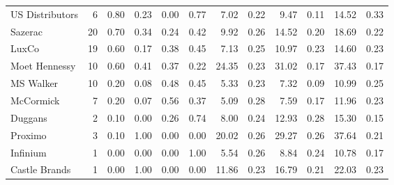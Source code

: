 \begin{tabular}{lrrrrrrrrrrr}
US Distributors & 6 & 0.80 & 0.23 & 0.00 & 0.77 & 7.02 & 0.22 & 9.47 & 0.11 & 14.52 & 0.33 \\
Sazerac & 20 & 0.70 & 0.34 & 0.24 & 0.42 & 9.92 & 0.26 & 14.52 & 0.20 & 18.69 & 0.22 \\
LuxCo & 19 & 0.60 & 0.17 & 0.38 & 0.45 & 7.13 & 0.25 & 10.97 & 0.23 & 14.60 & 0.23 \\
Moet Hennessy & 10 & 0.60 & 0.41 & 0.37 & 0.22 & 24.35 & 0.23 & 31.02 & 0.17 & 37.43 & 0.17 \\
MS Walker & 10 & 0.20 & 0.08 & 0.48 & 0.45 & 5.33 & 0.23 & 7.32 & 0.09 & 10.99 & 0.25 \\
McCormick & 7 & 0.20 & 0.07 & 0.56 & 0.37 & 5.09 & 0.28 & 7.59 & 0.17 & 11.96 & 0.23 \\
Duggans & 2 & 0.10 & 0.00 & 0.26 & 0.74 & 8.00 & 0.24 & 12.93 & 0.28 & 15.30 & 0.15 \\
Proximo & 3 & 0.10 & 1.00 & 0.00 & 0.00 & 20.02 & 0.26 & 29.27 & 0.26 & 37.64 & 0.21 \\
Infinium & 1 & 0.00 & 0.00 & 0.00 & 1.00 & 5.54 & 0.26 & 8.84 & 0.24 & 10.78 & 0.17 \\
Castle Brands & 1 & 0.00 & 1.00 & 0.00 & 0.00 & 11.86 & 0.23 & 16.79 & 0.21 & 22.03 & 0.23 \\
\bottomrule
\end{tabular}
